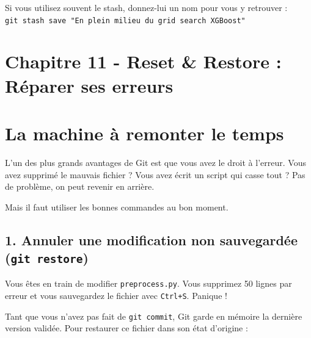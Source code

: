\documentclass[
  letterpaper,
  DIV=11,
  numbers=noendperiod]{scrreprt}
\begin{document}
\begin{tcolorbox}[enhanced jigsaw, arc=.35mm, bottomrule=.15mm, bottomtitle=1mm, breakable, colback=white, colbacktitle=quarto-callout-tip-color!10!white, colframe=quarto-callout-tip-color-frame, coltitle=black, left=2mm, leftrule=.75mm, opacityback=0, opacitybacktitle=0.6, rightrule=.15mm, title=\textcolor{quarto-callout-tip-color}{\faLightbulb}\hspace{0.5em}{Message personnalisé}, titlerule=0mm, toprule=.15mm, toptitle=1mm]

Si vous utilisez souvent le stash, donnez-lui un nom pour vous y
retrouver :
\texttt{git\ stash\ save\ "En\ plein\ milieu\ du\ grid\ search\ XGBoost"}

\end{tcolorbox}


\section{Chapitre 11 - Reset \& Restore : Réparer ses
erreurs}\label{chapitre-11---reset-restore-ruxe9parer-ses-erreurs}


\section{La machine à remonter le
temps}\label{la-machine-uxe0-remonter-le-temps}

L'un des plus grands avantages de Git est que vous avez le droit à
l'erreur. Vous avez supprimé le mauvais fichier ? Vous avez écrit un
script qui casse tout ? Pas de problème, on peut revenir en arrière.

Mais il faut utiliser les bonnes commandes au bon moment.

\subsection{\texorpdfstring{1. Annuler une modification non sauvegardée
(\texttt{git\ restore})}{1. Annuler une modification non sauvegardée (git restore)}}\label{annuler-une-modification-non-sauvegarduxe9e-git-restore}

Vous êtes en train de modifier \texttt{preprocess.py}. Vous supprimez 50
lignes par erreur et vous sauvegardez le fichier avec \texttt{Ctrl+S}.
Panique !

Tant que vous n'avez pas fait de \texttt{git\ commit}, Git garde en
mémoire la dernière version validée. Pour restaurer ce fichier dans son
état d'origine :
\end{document}
